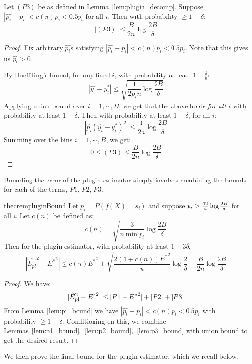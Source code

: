 \begin{lemma}
\label{lem:p3_bound}
Let $(P3)$ be as defined in Lemma~\ref{lem:plugin_decomp}.
Suppose $|\hat{p_i} - p_i| < c(n)p_i < 0.5p_i$ for all $i$. Then with probability $\geq 1 - \delta$:
\[ |(P3)| \leq \frac{B}{2n} \log{\frac{2B}{\delta}} \]
\end{lemma}

\begin{proof}
Fix arbitrary $\hat{p_i}$s satisfying $|\hat{p_i} - p_i| < c(n) p_i < 0.5p_i$. Note that this gives us $\hat{p_i} > 0$.

By Hoeffding's bound, for any fixed $i$, with probability at least $1-\frac{\delta}{b}$:
\[ |\hat{y_i} - y_i^*| \leq \sqrt{\frac{1}{2\hat{p_i}n} \log{\frac{2B}{\delta}}} \]
Applying union bound over $i = 1, \cdots, B$, we get that the above holds \emph{for all $i$} with probability at least $1 - \delta$. Then with probability at least $1 - \delta$, for all $i$:
\[ | \hat{p_i} (\hat{y_i} - y_i^*)^2 | \leq \frac{1}{2n} \log{\frac{2B}{\delta}} \]
Summing over the bins $i = 1, \cdots, B$, we get:
\[ 0 \leq (P3) \leq \frac{B}{2n} \log{\frac{2B}{\delta}}  \]
\end{proof}


Bounding the error of the plugin estimator simply involves combining the bounds for each of the terms, $P1$, $P2$, $P3$.

\begin{restatable}{theorem}{pluginBound}
\label{thm:plugin-bound}
Let $p_i = P(f(X) = s_i)$ and suppose $p_i > \frac{12}{n}\log{\frac{2B}{\delta}}{}$ for all $i$. Let $c(n)$ be defined as:
\[ c(n) = \sqrt{\frac{3}{n \min p_i} \log{\frac{2B}{\delta}}} \]
Then for the plugin estimator, with probability at least $1 - 3\delta$,
\[ | \hat{E_{pl}}^2 - {E^*}^2 | \leq c(n){E^*}^2 + \sqrt{\frac{2(1+c(n)){E^*}^2}{n} \log{\frac{2}{\delta}}} + \frac{B}{2n} \log{\frac{2B}{\delta}} \]
\end{restatable}

\begin{proof}
We have:
\[ |\hat{E}_{\textup{pl}}^2{} - {E^*}^2| \leq |P1 - {E^*}^2| + |P2| + |P3| \]
From Lemma~\ref{lem:pi_bound} we have $|\hat{p_i} - p_i| < c(n)p_i < 0.5p_i$ with probability $\geq 1 - \delta$. Conditioning on this, we combine Lemmas~\ref{lem:p1_bound},~\ref{lem:p2_bound},~\ref{lem:p3_bound} with union bound to get the desired result.
\end{proof}

We then prove the final bound for the plugin estimator, which we recall below.

